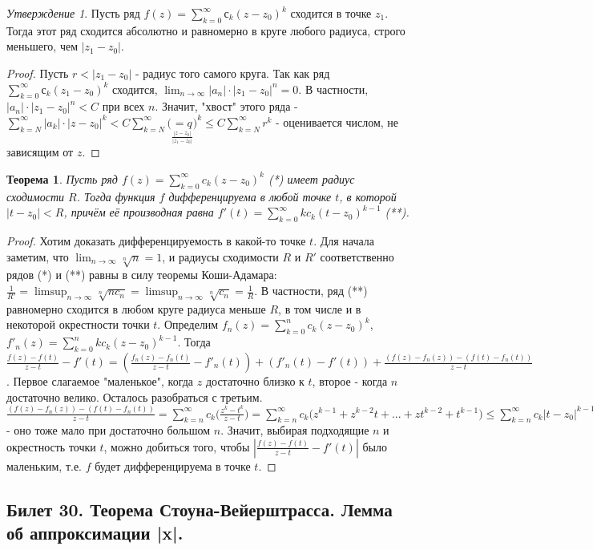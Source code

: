 \documentclass[a4paper]{article}
\theoremstyle{indented}
\newtheorem{theorem}{Теорема}
\theoremstyle{definition}
\theoremstyle{remark}
\newtheorem{stat}{Утверждение}
\DeclareMathOperator{\ra}{\rightarrow}
\begin{document}
\begin{stat}
    Пусть ряд $f(z)=\sum_{k=0}^{\infty} с_k(z-z_0)^k$ сходится в точке $z_1$. Тогда этот ряд сходится абсолютно и равномерно в круге любого радиуса, строго меньшего, чем $|z_1-z_0|$.
\end{stat}
\begin{proof}
   Пусть $r<|z_1-z_0|$ - радиус того самого круга. Так как ряд $\sum_{k=0}^{\infty} с_k(z_1-z_0)^k$ сходится, $\lim_{n \ra \infty} |a_n|\cdot |z_1-z_0|^n=0$. В частности, $|a_n|\cdot |z_1-z_0|^n < C$ при всех $n$. Значит, "хвост" этого ряда - $\sum_{k=N}^{\infty} |a_k| \cdot |z-z_0|^k < C \sum_{k=N}^{\infty} \big ( \underset{\frac{|z-z_0|}{|z_1-z_0|}}{=q}\big )^k \leq C \sum_{k=N}^{\infty} r^k$ - оценивается числом, не зависящим от $z$.
\end{proof}
\begin{theorem}
    Пусть ряд $f(z)=\sum_{k=0}^{\infty} c_k(z-z_0)^k$ (*) имеет радиус сходимости $R$. Тогда функция $f$ дифференцируема в любой точке $t$, в которой $|t-z_0|<R$, причём её производная равна $f'(t)=\sum_{k=0}^{\infty} kc_k(t-z_0)^{k-1}$ (**).
\end{theorem}
\begin{proof}
    Хотим доказать дифференцируемость в какой-то точке $t$. Для начала заметим, что $\lim_{n \ra \infty} \sqrt[n]{n}=1$, и радиусы сходимости $R$ и $R'$ соответственно рядов (*) и (**) равны в силу теоремы Коши-Адамара: $\frac{1}{R'}=\limsup_{n \ra \infty} \sqrt[n]{nc_n}=\limsup_{n \ra \infty} \sqrt[n]{c_n}=\frac{1}{R}$. В частности, ряд (**) равномерно сходится в любом круге радиуса меньше $R$, в том числе и в некоторой окрестности точки $t$. Определим $f_n(z)=\sum_{k=0}^n c_k(z-z_0)^k$, $f'_n(z)=\sum_{k=0}^{n} kc_k(z-z_0)^{k-1}$. Тогда $\frac{f(z)-f(t)}{z-t}-f'(t)=(\frac{f_n(z)-f_n(t)}{z-t}-f'_n(t))+(f'_n(t)-f'(t))+\frac{(f(z)-f_n(z))-(f(t)-f_n(t))}{z-t}$. Первое слагаемое "маленькое", когда $z$ достаточно близко к $t$, второе - когда $n$ достаточно велико. Осталось разобраться с третьим.  $\frac{(f(z)-f_n(z))-(f(t)-f_n(t))}{z-t}=\sum_{k=n}^{\infty}c_k \big ( \frac{z^k-t^k}{z-t}\big ) =\sum_{k=n}^{\infty}c_k \big ( z^{k-1}+z^{k-2}t+...+zt^{k-2}+t^{k-1}\big ) \leq \sum_{k=n}^{\infty}c_k|t-z_0|^{k-1}$ - оно тоже мало при достаточно большом $n$. Значит, выбирая подходящие $n$ и окрестность точки $t$, можно добиться того, чтобы $|\frac{f(z)-f(t)}{z-t}-f'(t)|$ было маленьким, т.е. $f$ будет дифференцируема в точке $t$.
\end{proof}

\subsection{Билет 30. Теорема Стоуна-Вейерштрасса. Лемма об аппроксимации |x|.}%
\end{document}
